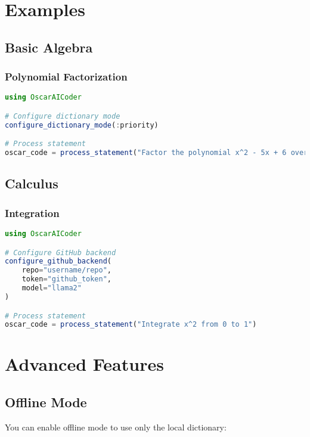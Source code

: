 \documentclass[11pt,a4paper]{article}
\begin{document}
\section{Examples}

\subsection{Basic Algebra}

\subsubsection{Polynomial Factorization}

\begin{lstlisting}[language=Julia]
using OscarAICoder

# Configure dictionary mode
configure_dictionary_mode(:priority)

# Process statement
oscar_code = process_statement("Factor the polynomial x^2 - 5x + 6 over the integers")
\end{lstlisting}

\subsection{Calculus}

\subsubsection{Integration}

\begin{lstlisting}[language=Julia]
using OscarAICoder

# Configure GitHub backend
configure_github_backend(
    repo="username/repo",
    token="github_token",
    model="llama2"
)

# Process statement
oscar_code = process_statement("Integrate x^2 from 0 to 1")
\end{lstlisting}

\section{Advanced Features}

\subsection{Offline Mode}

You can enable offline mode to use only the local dictionary:
\end{document}
